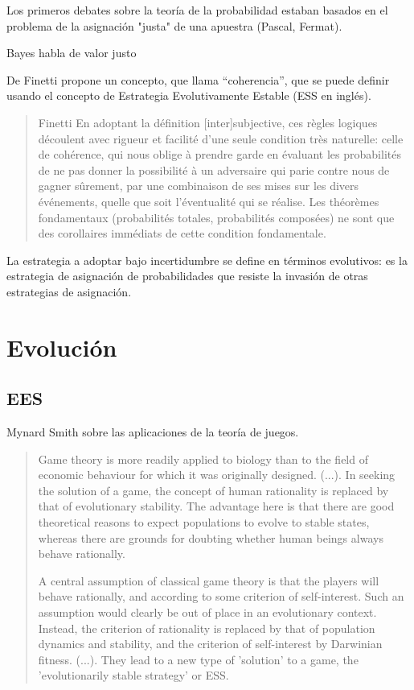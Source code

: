 \documentclass[a4paper,10pt]{article}
\begin{document}
Los primeros debates sobre la teoría de la probabilidad estaban basados en el problema de la asignación "justa" de una apuestra (Pascal, Fermat).

Bayes habla de valor justo

De Finetti propone un concepto, que llama ``coherencia'', que se puede definir usando el concepto de Estrategia Evolutivamente Estable (ESS en inglés).

\begin{quotation} Finetti
En adoptant la définition [inter]subjective, ces règles logiques découlent avec rigueur et facilité d’une seule condition très naturelle: celle de cohérence, qui nous oblige à prendre garde en évaluant les probabilités de ne pas donner la possibilité à un adversaire qui parie contre nous de gagner sûrement, par une  combinaison de ses mises sur les divers événements, quelle que soit l’éventualité qui se réalise.
Les théorèmes fondamentaux (probabilités totales, probabilités composées) ne sont que des corollaires immédiats de cette condition fondamentale.
\end{quotation}

La estrategia a adoptar bajo incertidumbre se define en términos evolutivos: es la estrategia de asignación de probabilidades que resiste la invasión de otras estrategias de asignación.


\section{Evolución}

\subsection{EES}

Mynard Smith sobre las aplicaciones de la teoría de juegos.
\begin{quotation}
    Game theory is more readily applied to biology than to the field of economic behaviour for which it was originally designed. (...).
    In seeking the solution of a game, the concept of human rationality is replaced by that of evolutionary stability.
    The advantage here is that there are good theoretical reasons to expect populations to evolve to stable states, whereas there are grounds for doubting whether human beings always behave rationally. \cite{maynardSmith1982-evolutionTheoryGames}
    
    A central assumption of classical game theory is that the players will behave rationally, and according to some criterion of self-interest.
    Such an assumption would clearly be out of place in an evolutionary context.
    Instead, the criterion of rationality is replaced by that of population dynamics and stability, and the criterion of self-interest by Darwinian fitness. (...).
    They lead to a new type of 'solution' to a game, the 'evolutionarily stable strategy' or ESS.
\end{quotation}
\end{document}
